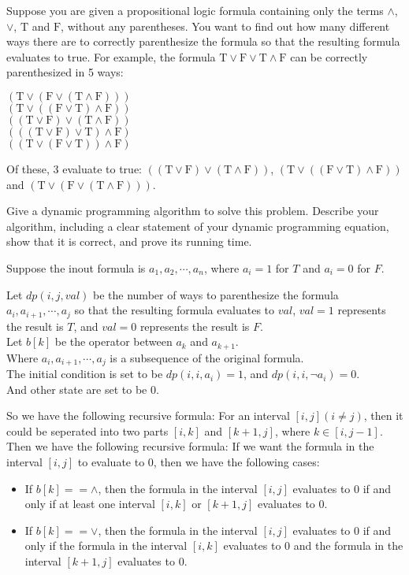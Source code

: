\problem{}
Suppose you are given a propositional logic formula containing only the terms $\land$, $\lor$, $\text{T}$ and $\text{F}$, without any parentheses. You want to find out how many different ways there are to correctly parenthesize the formula so that the resulting formula evaluates to true. For example, the formula $\text{T} \lor \text{F} \lor \text{T} \land \text{F}$ can be correctly parenthesized in 5 ways:
\begin{center}
$(\text{T} \lor (\text{F} \lor (\text{T} \land \text{F})))$ \\
$(\text{T} \lor ((\text{F} \lor \text{T}) \land \text{F}))$ \\
$((\text{T} \lor \text{F}) \lor (\text{T} \land \text{F}))$ \\
$(((\text{T} \lor \text{F}) \lor \text{T}) \land \text{F})$ \\
$((\text{T} \lor (\text{F} \lor \text{T})) \land \text{F})$
\end{center}
Of these, 3 evaluate to true: $((\text{T} \lor \text{F}) \lor (\text{T} \land \text{F}))$, $(\text{T} \lor ((\text{F} \lor \text{T}) \land \text{F}))$ and $(\text{T} \lor (\text{F} \lor (\text{T} \land \text{F})))$.

Give a dynamic programming algorithm to solve this problem. Describe your algorithm, including a clear statement of your dynamic programming equation, show that it is correct, and prove its running time.

\solution{}
Suppose the inout formula is $a_1,a_2,\cdots,a_n$, where $a_i=1$ for $T$ and $a_i=0$ for $F$.

Let $dp(i,j,val)$ be the number of ways to parenthesize the formula $a_i,a_{i+1},\cdots,a_j$ so that the resulting formula evaluates to $val$, $val = 1$ represents the result is $T$, and $val = 0$ represents the result is $F$.\\
Let $b[k]$ be the operator between $a_k$ and $a_{k+1}$.\\
Where $a_i,a_{i+1},\cdots,a_j$ is a subsequence of the original formula.\\

The initial condition is set to be $dp(i,i,a_i)=1$, and $dp(i,i,\neg a_i)=0$.\\
And other state are set to be $0$.

So we have the following recursive formula:
For an interval $[i,j](i\neq j)$, then it could be seperated into two parts $[i,k]$ and $[k+1,j]$, where $k\in[i,j-1]$.\\
Then we have the following recursive formula:
If we want the formula in the interval $[i,j]$ to evaluate to $0$, then we have the following cases:
\begin{itemize}
    \item If $b[k] == \land$, then the formula in the interval $[i,j]$ evaluates to $0$ if and only if at least one interval $[i,k]$ or $[k+1,j]$ evaluates to $0$.
    \item If $b[k] == \lor$, then the formula in the interval $[i,j]$ evaluates to $0$ if and only if the formula in the interval $[i,k]$ evaluates to $0$ and the formula in the interval $[k+1,j]$ evaluates to $0$.
\end{itemize}

